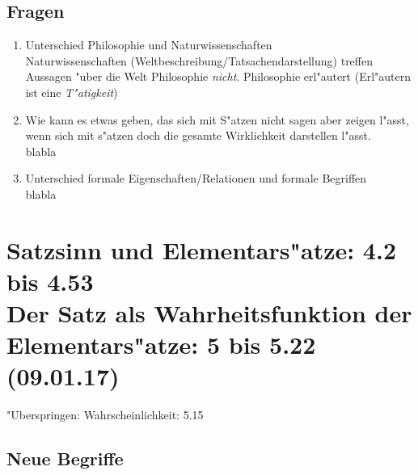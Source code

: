 \documentclass[emulatestandardclasses]{scrartcl}
\begin{document}
\subsection{Fragen}

\begin{enumerate}
  \item {\color{NavyBlue}Unterschied Philosophie und Naturwissenschaften}\\
{\color{ForestGreen} Naturwissenschaften (Weltbeschreibung/Tatsachendarstellung) treffen Aussagen "uber die Welt Philosophie \emph{nicht}. Philosophie erl"autert (Erl"autern ist eine \emph{T"atigkeit})}
  \item {\color{NavyBlue} Wie kann es etwas geben, das sich mit S"atzen nicht sagen aber zeigen l"asst, wenn sich mit s"atzen doch die gesamte Wirklichkeit darstellen l"asst.}\\
{\color{ForestGreen} blabla}
    \item {\color{NavyBlue} Unterschied formale Eigenschaften/Relationen und formale Begriffen}\\
{\color{ForestGreen} blabla}
\end{enumerate}




\section{Satzsinn und Elementars"atze: 4.2 bis 4.53\\Der Satz als Wahrheitsfunktion der Elementars"atze: 5 bis 5.22\\(09.01.17)}

"Uberspringen: Wahrscheinlichkeit: 5.15

\vspace{10pt}
\subsection{Neue Begriffe}
\end{document}

